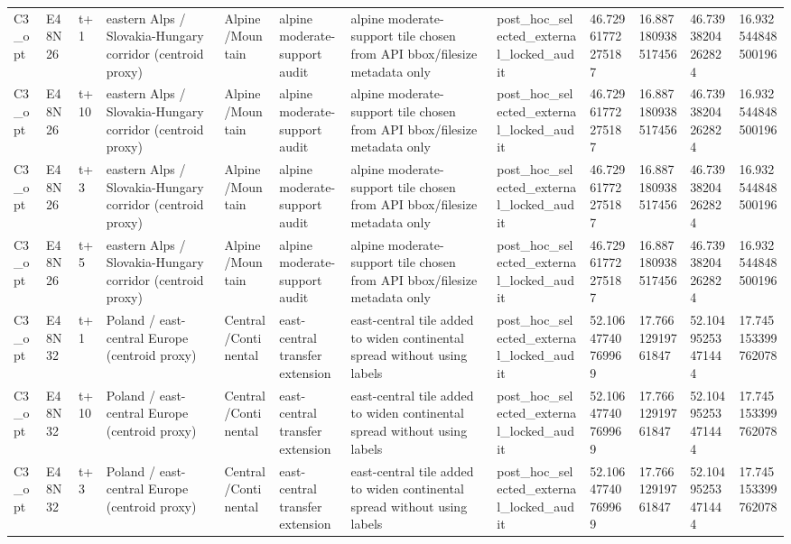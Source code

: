 \begin{landscape}
\begin{longtable}{llllllllllll}
C3\_opt & E48N26 & t+1 & eastern Alps / Slovakia-Hungary corridor (centroid proxy) & Alpine/Mountain & alpine moderate-support audit & alpine moderate-support tile chosen from API bbox/filesize metadata only & post\_hoc\_selected\_external\_locked\_audit & 46.72961772275187 & 16.887180938517456 & 46.73938204262824 & 16.932544848500196 \\
C3\_opt & E48N26 & t+10 & eastern Alps / Slovakia-Hungary corridor (centroid proxy) & Alpine/Mountain & alpine moderate-support audit & alpine moderate-support tile chosen from API bbox/filesize metadata only & post\_hoc\_selected\_external\_locked\_audit & 46.72961772275187 & 16.887180938517456 & 46.73938204262824 & 16.932544848500196 \\
C3\_opt & E48N26 & t+3 & eastern Alps / Slovakia-Hungary corridor (centroid proxy) & Alpine/Mountain & alpine moderate-support audit & alpine moderate-support tile chosen from API bbox/filesize metadata only & post\_hoc\_selected\_external\_locked\_audit & 46.72961772275187 & 16.887180938517456 & 46.73938204262824 & 16.932544848500196 \\
C3\_opt & E48N26 & t+5 & eastern Alps / Slovakia-Hungary corridor (centroid proxy) & Alpine/Mountain & alpine moderate-support audit & alpine moderate-support tile chosen from API bbox/filesize metadata only & post\_hoc\_selected\_external\_locked\_audit & 46.72961772275187 & 16.887180938517456 & 46.73938204262824 & 16.932544848500196 \\
C3\_opt & E48N32 & t+1 & Poland / east-central Europe (centroid proxy) & Central/Continental & east-central transfer extension & east-central tile added to widen continental spread without using labels & post\_hoc\_selected\_external\_locked\_audit & 52.10647740769969 & 17.76612919761847 & 52.10495253471444 & 17.745153399762078 \\
C3\_opt & E48N32 & t+10 & Poland / east-central Europe (centroid proxy) & Central/Continental & east-central transfer extension & east-central tile added to widen continental spread without using labels & post\_hoc\_selected\_external\_locked\_audit & 52.10647740769969 & 17.76612919761847 & 52.10495253471444 & 17.745153399762078 \\
C3\_opt & E48N32 & t+3 & Poland / east-central Europe (centroid proxy) & Central/Continental & east-central transfer extension & east-central tile added to widen continental spread without using labels & post\_hoc\_selected\_external\_locked\_audit & 52.10647740769969 & 17.76612919761847 & 52.10495253471444 & 17.745153399762078 \\

\end{longtable}
\end{landscape}
